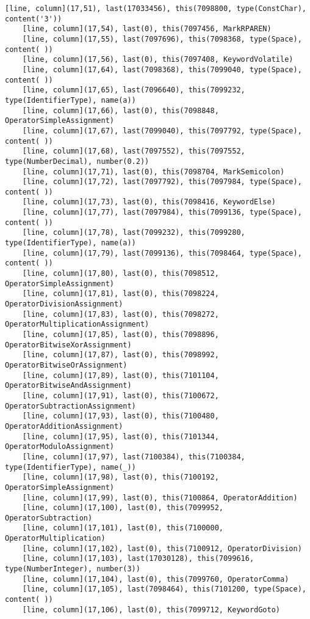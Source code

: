 \documentclass[UTF8]{ctexart}
\begin{document}
{\begin{lstlisting}[language={[ANSI]C++}]
    [line, column](17,51), last(17033456), this(7098800, type(ConstChar), content('3'))
    [line, column](17,54), last(0), this(7097456, MarkRPAREN)
    [line, column](17,55), last(7097696), this(7098368, type(Space), content( ))
    [line, column](17,56), last(0), this(7097408, KeywordVolatile)
    [line, column](17,64), last(7098368), this(7099040, type(Space), content( ))
    [line, column](17,65), last(7096640), this(7099232, type(IdentifierType), name(a))
    [line, column](17,66), last(0), this(7098848, OperatorSimpleAssignment)
    [line, column](17,67), last(7099040), this(7097792, type(Space), content( ))
    [line, column](17,68), last(7097552), this(7097552, type(NumberDecimal), number(0.2))
    [line, column](17,71), last(0), this(7098704, MarkSemicolon)
    [line, column](17,72), last(7097792), this(7097984, type(Space), content( ))
    [line, column](17,73), last(0), this(7098416, KeywordElse)
    [line, column](17,77), last(7097984), this(7099136, type(Space), content( ))
    [line, column](17,78), last(7099232), this(7099280, type(IdentifierType), name(a))
    [line, column](17,79), last(7099136), this(7098464, type(Space), content( ))
    [line, column](17,80), last(0), this(7098512, OperatorSimpleAssignment)
    [line, column](17,81), last(0), this(7098224, OperatorDivisionAssignment)
    [line, column](17,83), last(0), this(7098272, OperatorMultiplicationAssignment)
    [line, column](17,85), last(0), this(7098896, OperatorBitwiseXorAssignment)
    [line, column](17,87), last(0), this(7098992, OperatorBitwiseOrAssignment)
    [line, column](17,89), last(0), this(7101104, OperatorBitwiseAndAssignment)
    [line, column](17,91), last(0), this(7100672, OperatorSubtractionAssignment)
    [line, column](17,93), last(0), this(7100480, OperatorAdditionAssignment)
    [line, column](17,95), last(0), this(7101344, OperatorModuloAssignment)
    [line, column](17,97), last(7100384), this(7100384, type(IdentifierType), name(_))
    [line, column](17,98), last(0), this(7100192, OperatorSimpleAssignment)
    [line, column](17,99), last(0), this(7100864, OperatorAddition)
    [line, column](17,100), last(0), this(7099952, OperatorSubtraction)
    [line, column](17,101), last(0), this(7100000, OperatorMultiplication)
    [line, column](17,102), last(0), this(7100912, OperatorDivision)
    [line, column](17,103), last(17030128), this(7099616, type(NumberInteger), number(3))
    [line, column](17,104), last(0), this(7099760, OperatorComma)
    [line, column](17,105), last(7098464), this(7101200, type(Space), content( ))
    [line, column](17,106), last(0), this(7099712, KeywordGoto)

\end{lstlisting}}
\end{document}
